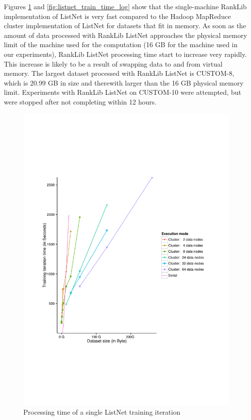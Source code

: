 Figures \ref{fig:listnet_train_time} and \ref{fig:listnet_train_time_log} show that the single-machine RankLib implementation of ListNet is very fast compared to the Hadoop MapReduce cluster implementation of ListNet for datasets that fit in memory. As soon as the amount of data processed with RankLib ListNet approaches the physical memory limit of the machine used for the computation (16 GB for the machine used in our experiments), RankLib ListNet processing time start to increase very rapidly. This increase is likely to be a result of swapping data to and from virtual memory. The largest dataset processed with RankLib ListNet is CUSTOM-8, which is 20.99 GB in size and therewith larger than the 16 GB physical memory limit. Experiments with RankLib ListNet on CUSTOM-10 were attempted, but were stopped after not completing within 12 hours.\\

\begin{figure}[!h]
\centering
\includegraphics[trim=0cm 5cm 0cm 5cm, scale=0.8]{gfx/time_single.pdf}
\caption{Processing time of a single ListNet training iteration}
\label{fig:listnet_train_time}
\end{figure}

